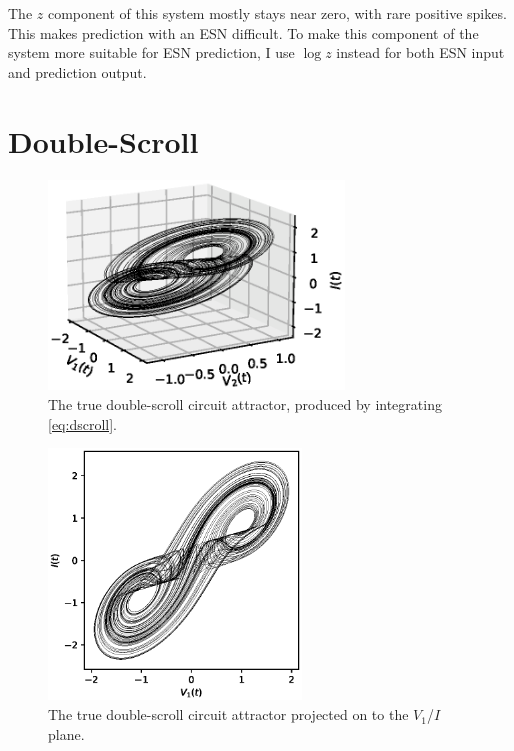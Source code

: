 The $z$ component of this system mostly stays near zero, with rare
positive spikes. This makes prediction with an ESN difficult. To make
this component of the system more suitable for ESN prediction, I use
$\log z$ instead for both ESN input and prediction output.

\section{Double-Scroll}\label{sec:dscroll}

\begin{figure}
  \includegraphics[width=0.7\textwidth]{figures/dscroll-3d}
  \caption{The true double-scroll circuit attractor, produced by integrating \cref{eq:dscroll}.}%
  \label{fig:dscroll-3d}
\end{figure}

\begin{figure}
  \includegraphics[width=0.6\textwidth]{figures/dscroll}
  \caption{The true double-scroll circuit attractor projected on to the $V_1$/$I$ plane.}%
  \label{fig:dscroll}
\end{figure}

